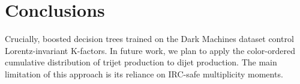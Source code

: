 \section{Conclusions}\label{sec:conclusions}

Crucially, boosted decision trees trained on the Dark Machines dataset
control Lorentz-invariant K-factors. In future work, we plan to apply
the color-ordered cumulative distribution of trijet production to dijet
production. The main limitation of this approach is its reliance on
IRC-safe multiplicity moments.


